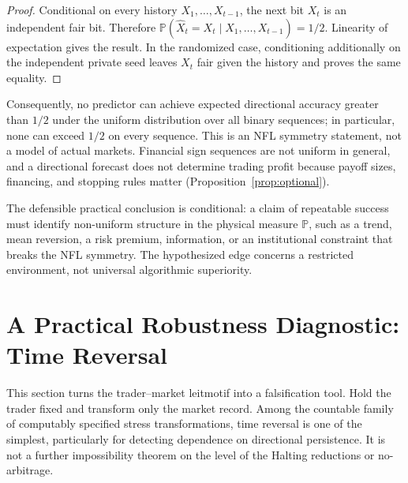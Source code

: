 \documentclass[aps,pra,reprint,superscriptaddress,amsmath,amssymb,floatfix]{revtex4-2}
\theoremstyle{plain}
\theoremstyle{definition}
\theoremstyle{remark}
\begin{document}
\begin{proof}
Conditional on every history \(X_1,\ldots,X_{t-1}\), the next bit \(X_t\) is
an independent fair bit. Therefore
\(\mathbb{P}(\widehat X_t=X_t\mid X_1,\ldots,X_{t-1})=1/2\).
Linearity of expectation gives the result. In the randomized case, conditioning
additionally on the independent private seed leaves \(X_t\) fair given the
history and proves the same equality.
\end{proof}

Consequently, no predictor can achieve expected directional accuracy greater
than \(1/2\) under the uniform distribution over all binary sequences; in
particular, none can exceed \(1/2\) on every sequence. This is an NFL symmetry
statement, not a model of actual markets. Financial sign sequences are not
uniform in general, and a directional forecast does not determine trading
profit because payoff sizes, financing, and stopping rules matter
(Proposition~\ref{prop:optional}).

The defensible practical conclusion is conditional: a claim of repeatable
success must identify non-uniform structure in the physical measure
\(\mathbb{P}\), such as a trend, mean reversion, a risk premium, information,
or an institutional constraint that breaks the NFL symmetry. The hypothesized
edge concerns a restricted environment, not universal algorithmic
superiority.

\section{A Practical Robustness Diagnostic: Time Reversal}
\label{sec:criterion}

This section turns the trader--market leitmotif into a falsification tool. Hold
the trader fixed and transform only the market record. Among the countable
family of computably specified stress transformations, time reversal is one of
the simplest, particularly for detecting dependence on directional
persistence. It is not a further impossibility theorem on the level of the
Halting reductions or no-arbitrage.
\end{document}
